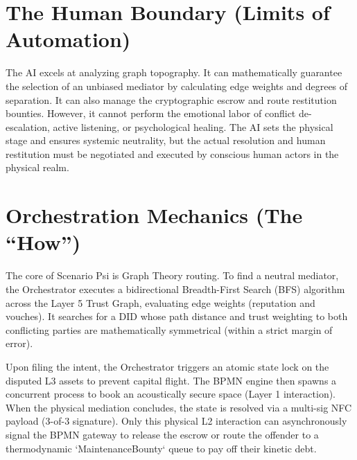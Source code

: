 \section{The Human Boundary (Limits of Automation)}
The AI excels at analyzing graph topography. It can mathematically guarantee the selection of an unbiased mediator by calculating edge weights and degrees of separation. It can also manage the cryptographic escrow and route restitution bounties. However, it cannot perform the emotional labor of conflict de-escalation, active listening, or psychological healing. The AI sets the physical stage and ensures systemic neutrality, but the actual resolution and human restitution must be negotiated and executed by conscious human actors in the physical realm.

\section{Orchestration Mechanics (The ``How'')}
The core of Scenario Psi is Graph Theory routing. To find a neutral mediator, the Orchestrator executes a bidirectional Breadth-First Search (BFS) algorithm across the Layer 5 Trust Graph, evaluating edge weights (reputation and vouches). It searches for a DID whose path distance and trust weighting to both conflicting parties are mathematically symmetrical (within a strict margin of error).

Upon filing the intent, the Orchestrator triggers an atomic state lock on the disputed L3 assets to prevent capital flight. The BPMN engine then spawns a concurrent process to book an acoustically secure space (Layer 1 interaction). When the physical mediation concludes, the state is resolved via a multi-sig NFC payload (3-of-3 signature). Only this physical L2 interaction can asynchronously signal the BPMN gateway to release the escrow or route the offender to a thermodynamic `MaintenanceBounty` queue to pay off their kinetic debt.
